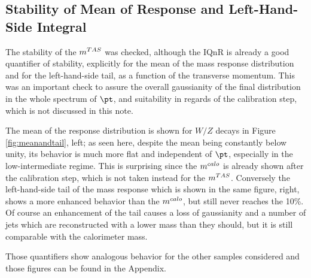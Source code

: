 \subsection{Stability of Mean of Response and Left-Hand-Side Integral }
The stability of the $m^{TAS}$ was checked, although the IQnR is already a good quantifier of stability, explicitly for the mean of the mass response distribution and for the left-hand-side tail, as a function of the transverse momentum. This was an important check to assure the overall gaussianity of the final distribution in the whole spectrum of $\pt$, and suitability in regards of the calibration step, which is not discussed in this note.

The mean of the response distribution is shown for $W/Z$ decays in Figure \ref{fig:meanandtail}, left; as seen here, despite the mean being constantly below unity, its behavior is much more flat and independent of $\pt$, especially in the low-intermediate regime. This is surprising since the $m^{calo}$ is already shown after the calibration step, which is not taken instead for the $m^{TAS}$. Conversely the left-hand-side tail of the mass response which is shown in the same figure, right, shows a more enhanced behavior than the $m^{calo}$, but still never reaches the 10\%. Of course an enhancement of the tail causes a loss of gaussianity and a number of jets which are reconstructed with a lower mass than they should, but it is still comparable with the calorimeter mass.

Those quantifiers show analogous behavior for the other samples considered and those figures can be found in the Appendix.

